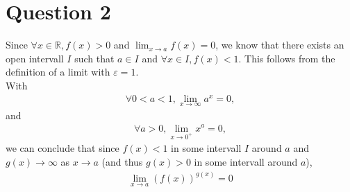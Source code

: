 \documentclass{article}
\begin{document}
\section*{Question 2}
Since $\forall x\in\mathbb{R}, f(x) > 0$ and $\lim_{x\to a}f(x)=0$, we know that there exists an open intervall $I$ such that $a\in I$ and $\forall x\in I, f(x) < 1$. This follows from the definition of a limit with $\varepsilon = 1$.\\
With
\begin{align*}
  \forall 0<a<1, \lim_{x\to\infty}a^x=0,
\end{align*}
and
\begin{align*}
  \forall a>0, \lim_{x\to 0^+}x^a=0,
\end{align*}
we can conclude that since $f(x)<1$ in some intervall $I$ around $a$ and $g(x)\to\infty$ as $x\to a$ (and thus $g(x)>0$ in some intervall around $a$),
\begin{align*}
  \lim_{x\to a}\left(f(x)\right)^{g(x)} = 0
\end{align*}
\end{document}

